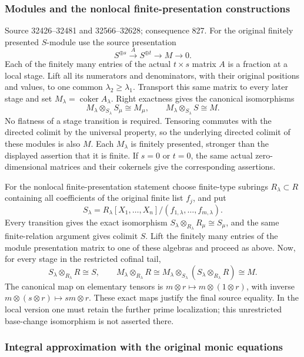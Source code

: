 \subsubsection{Modules and the nonlocal finite-presentation constructions}\label{modules-and-the-nonlocal-finite-presentation-constructions}

Source 32426--32481 and 32566--32628; consequence 827. For the original finitely presented \(S\)-module use the source presentation \[
S^{\oplus s}\xrightarrow{A}S^{\oplus t}\longrightarrow M\longrightarrow0.
\] Each of the finitely many entries of the actual \(t\times s\) matrix \(A\) is a fraction at a local stage. Lift all its numerators and denominators, with their original positions and values, to one common \(\lambda_2\ge\lambda_1\). Transport this same matrix to every later stage and set \(M_\lambda=\operatorname{coker}A_\lambda\). Right exactness gives the canonical isomorphisms \[
M_\lambda\otimes_{S_\lambda}S_\mu\cong M_\mu,\qquad
M_\lambda\otimes_{S_\lambda}S\cong M.
\] No flatness of a stage transition is required. Tensoring commutes with the directed colimit by the universal property, so the underlying directed colimit of these modules is also \(M\). Each \(M_\lambda\) is finitely presented, stronger than the displayed assertion that it is finite. If \(s=0\) or \(t=0\), the same actual zero-dimensional matrices and their cokernels give the corresponding assertions.

For the nonlocal finite-presentation statement choose finite-type subrings \(R_\lambda\subset R\) containing all coefficients of the original finite list \(f_j\), and put \[
S_\lambda=R_\lambda[X_1,\ldots,X_n]/(f_{1,\lambda},\ldots,f_{m,\lambda}).
\] Every transition gives the exact isomorphism \(S_\lambda\otimes_{R_\lambda}R_\mu\cong S_\mu\), and the same finite-relation argument gives colimit \(S\). Lift the finitely many entries of the module presentation matrix to one of these algebras and proceed as above. Now, for every stage in the restricted cofinal tail, \[
S_\lambda\otimes_{R_\lambda}R\cong S,\qquad
M_\lambda\otimes_{R_\lambda}R
\cong M_\lambda\otimes_{S_\lambda}(S_\lambda\otimes_{R_\lambda}R)
\cong M.
\] The canonical map on elementary tensors is \(m\otimes r\mapsto m\otimes(1\otimes r)\), with inverse \(m\otimes(s\otimes r)\mapsto sm\otimes r\). These exact maps justify the final source equality. In the local version one must retain the further prime localization; this unrestricted base-change isomorphism is not asserted there.

\subsubsection{Integral approximation with the original monic equations}\label{integral-approximation-with-the-original-monic-equations}


